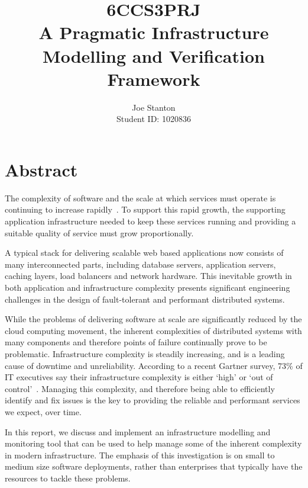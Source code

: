 \documentclass{cshonours}
\title{6CCS3PRJ \\\vspace{0.5cm}
  A Pragmatic Infrastructure Modelling and Verification Framework}
\author{Joe Stanton\\\vspace{0.5cm}
  Student ID: 1020836
}
\begin{document}
\maketitle

\chapter*{Abstract}




The complexity of software and the scale at which services must operate is continuing to increase rapidly~\cite{SoftwareComplexity}.
To support this rapid growth, the supporting application infrastructure needed to keep these services running and providing a suitable quality of service must grow proportionally.

A typical stack for delivering scalable web based applications now consists of many interconnected parts, including database servers, application servers, caching layers, load balancers and network hardware.
This inevitable growth in both application and infrastructure complexity presents significant engineering challenges in the design of fault-tolerant and performant distributed systems.

While the problems of delivering software at scale are significantly reduced by the cloud computing movement, the inherent complexities of distributed systems with many components and therefore points of failure continually prove to be problematic. Infrastructure complexity is steadily increasing, and is a leading cause of downtime and unreliability. According to a recent Gartner survey, 73\% of IT executives say their infrastructure complexity is either `high' or `out of control'~\cite{Gartner2013}. Managing this complexity, and therefore being able to efficiently identify and fix issues is the key to providing the reliable and performant services we expect, over time.

In this report, we discuss and implement an infrastructure modelling and monitoring tool that can be used to help manage some of the inherent complexity in modern infrastructure. The emphasis of this investigation is on small to medium size software deployments, rather than enterprises that typically have the resources to tackle these problems.
\end{document}
